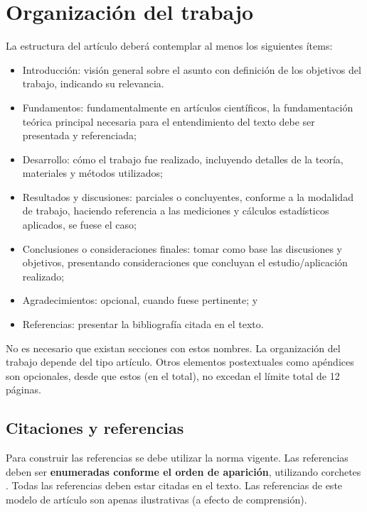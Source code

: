 \documentclass[12pt, a4paper, twoside, twocolumn]{article}
\begin{document}
\section{Organización del trabajo}

La estructura del artículo deberá contemplar al menos los siguientes ítems:
%
\begin{itemize}[noitemsep,topsep=-1ex] \itemsep=3pt
	\item Introducción: visión general sobre el asunto con definición de los objetivos del trabajo, indicando su relevancia.
	\item Fundamentos: fundamentalmente en artículos científicos, la fundamentación teórica principal necesaria para el entendimiento del texto debe ser presentada y referenciada;
	\item Desarrollo: cómo el trabajo fue realizado, incluyendo detalles de la teoría, materiales y métodos utilizados;
	\item Resultados y discusiones: parciales o concluyentes, conforme a la modalidad de trabajo, haciendo referencia a las mediciones y cálculos estadísticos aplicados, se fuese el caso;
	\item Conclusiones o consideraciones finales: tomar como base las discusiones y objetivos, presentando consideraciones que concluyan el estudio/aplicación realizado;
	\item Agradecimientos: opcional, cuando fuese pertinente; y
	\item Referencias: presentar la bibliografía citada en el texto.
\end{itemize}
%
No es necesario que existan secciones con estos nombres. La organización del trabajo depende del tipo artículo.
Otros elementos postextuales como apéndices son opcionales, desde que estos (en el total), no excedan el límite total de 12 páginas.

\subsection{Citaciones y referencias}

Para construir las referencias se debe utilizar la norma vigente. Las referencias deben ser \textbf{enumeradas conforme el orden de aparición}, utilizando corchetes \cite{Gomes-2015}. Todas las referencias deben estar citadas en el texto. Las referencias \cite{Mareze-2017,Fonseca-2013,Brandao-2017,Gomes-2015,Oppenheim-2010,Muller-2001,Mareze-2019,Borges-2018,Ristow-2016} de este modelo de artículo son apenas ilustrativas (a efecto de comprensión).
\end{document}
